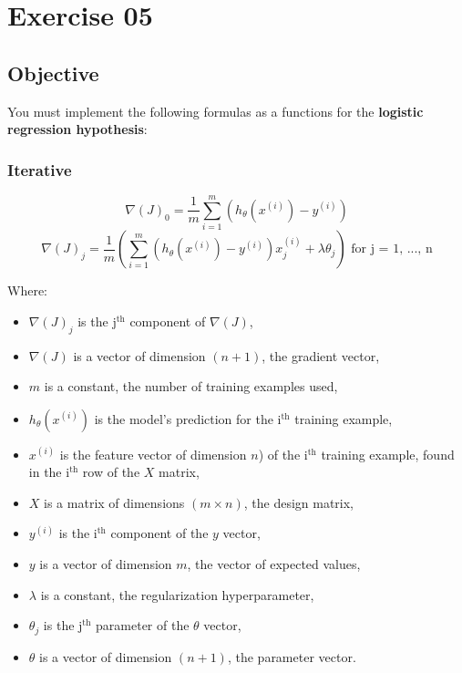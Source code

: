 \chapter{Exercise 05}
%
{}
\makeheaderfilesforbidden

\section*{Objective}
You must implement the following formulas as a functions for the \textbf{logistic regression hypothesis}:

\subsection*{Iterative}

$$
\nabla(J)_0 = \frac{1}{m}\sum_{i=1}^{m}(h_\theta(x^{(i)}) - y^{(i)})
$$
$$
\nabla(J)_j = \frac{1}{m}\left(\sum_{i=1}^{m}(h_\theta(x^{(i)}) - y^{(i)})x_j^{(i)} + \lambda \theta_j\right) \text{ for j = 1, ..., n}
$$

Where:
\begin{itemize}
  \item $\nabla(J)_j$ is the j$^\text{th}$ component of $\nabla(J)$,
  \item $\nabla(J)$ is a vector of dimension $(n + 1)$, the gradient vector,
  \item $m$ is a constant, the number of training examples used,
  \item $h_\theta(x^{(i)})$ is the model's prediction for the i$^\text{th}$ training example,
  \item $x^{(i)}$ is the feature vector of dimension $n$) of the i$^\text{th}$ training example, found in the i$^\text{th}$ row of the $X$ matrix,
  \item $X$ is a matrix of dimensions $(m \times n)$, the design matrix,
  \item $y^{(i)}$ is the i$^\text{th}$ component of the $y$ vector,
  \item $y$ is a vector of dimension $m$, the vector of expected values,
  \item $\lambda$ is a constant, the regularization hyperparameter,
  \item $\theta_j$ is the j$^\text{th}$ parameter of the $\theta$ vector,
  \item $\theta$ is a vector of dimension $(n + 1)$, the parameter vector.
\end{itemize}

